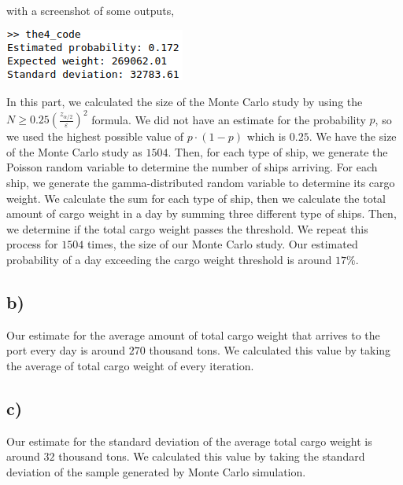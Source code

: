\documentclass[12pt]{article}
\begin{document}
\noindent
with a screenshot of some outputs,

\begin{center}
  \includegraphics[scale = 1]{the4_output.png}
\end{center}

In this part, we calculated the size of the Monte Carlo study by using the $N
\geq 0.25(\frac{z_{\alpha/2}}{\varepsilon})^2$ formula. We did not have an
estimate for the probability $p$, so we used the highest possible value of
$p\cdot(1-p)$ which is $0.25$. We have the size of the Monte Carlo study as
$1504$. Then, for each type of ship, we generate the Poisson random variable to
determine the number of ships arriving. For each ship, we generate the
gamma-distributed random variable to determine its cargo weight. We calculate
the sum for each type of ship, then we calculate the total amount of cargo
weight in a day by summing three different type of ships. Then, we determine if
the total cargo weight passes the threshold. We repeat this process for $1504$
times, the size of our Monte Carlo study. Our estimated probability of a day
exceeding the cargo weight threshold is around $17\%$.

\subsection*{b)}

Our estimate for the average amount of total cargo weight that arrives to the
port every day is around $270$ thousand tons. We calculated this value by taking
the average of total cargo weight of every iteration.

\subsection*{c)}

Our estimate for the standard deviation of the average total cargo weight is
around $32$ thousand tons. We calculated this value by taking the standard
deviation of the sample generated by Monte Carlo simulation.
\end{document}

